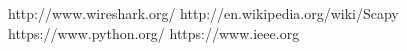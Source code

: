 \documentclass[%
        final,
        notitlepage,
        narroweqnarray,
        inline,
        ]{ieee}
\begin{document}
\begin{thebibliography}{1}

http://www.wireshark.org/
http://en.wikipedia.org/wiki/Scapy
https://www.python.org/
https://www.ieee.org
\end{thebibliography}




%
%
%
%
% 
% 
% 
% 
% 
% 
% 
% 
% 
% 
%
% 
\end{document}
